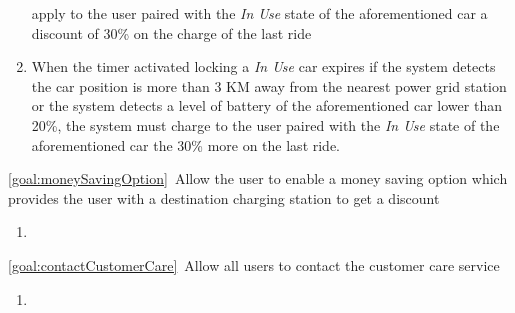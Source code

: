 \begin{description}
\begin{enumerate}[resume*]
  				apply to the user paired with the \emph{In Use} state of the aforementioned car a
  				discount of 30\% on the charge of the last ride
  				\item When the timer activated locking a \emph{In Use} car expires if the system
  				detects the car position is more than 3 KM away from the nearest power grid station
  				or the system detects a level of battery of the aforementioned car lower than 20\%, 
  				the system must charge to the user paired with the \emph{In Use} state of the 
  				aforementioned car the 30\% more on the last ride. 
   			\end{enumerate}
  		\item \ref{goal:moneySavingOption}\ Allow the user to enable a money saving option which
  		provides the user with a destination charging station to get a discount
  			\begin{enumerate}[resume*]
  				\item
   			\end{enumerate}
  		\item \ref{goal:contactCustomerCare}\ Allow all users to contact the customer care service
  			\begin{enumerate}[resume*]
  				\item
   			\end{enumerate}
  	\end{description}

